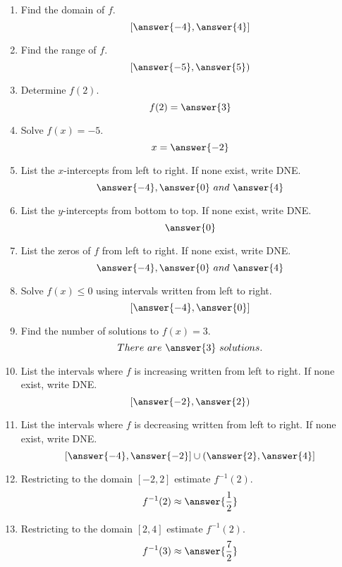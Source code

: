 \documentclass{ximera}
\begin{document}
\begin{exercise}
\begin{enumerate}
\item  Find the domain of $f$. \[[\answer{-4},\answer{4}]\] \label{usesecondfuncgraphfirst}
\item  Find the range of $f$.  \[[\answer{-5},\answer{5})\]
\item  Determine $f(2)$. \[f(2)=\answer{3}\]
\item  Solve $f(x) = -5$. \[x=\answer{-2}\]
\item  List the $x$-intercepts from left to right. If none exist, write DNE. \[\answer{-4}, \answer{0}\ and\ \answer{4}\]
\item  List the $y$-intercepts from bottom to top. If none exist, write DNE. \[\answer{0}\]
\item  List the zeros of $f$ from left to right. If none exist, write DNE. \[\answer{-4}, \answer{0}\  and\ \answer{4}\]
\item  Solve $f(x) \leq 0$ using intervals written from left to right. \[[\answer{-4},\answer{0}]\]
\item  Find the number of solutions to $f(x) = 3$. \[There\ are\ \answer{3}\ solutions.\]
\item  List the intervals where $f$ is increasing written from left to right. If none exist, write DNE. \[[\answer{-2},\answer{2})\]
\item  List the intervals where $f$ is decreasing written from left to right. If none exist, write DNE. \[[\answer{-4},\answer{-2}]\cup(\answer{2},\answer{4}]\]
\item  Restricting to the domain $[-2,2]$ estimate $f^{-1}(2)$. \[f^{-1}(2)\approx\answer{\frac{1}{2}}\]
\item  Restricting to the domain $[2,4]$ estimate $f^{-1}(2)$. \[f^{-1}(3)\approx\answer{\frac{7}{2}}\]
\end{enumerate}

\end{exercise}
\end{document}

